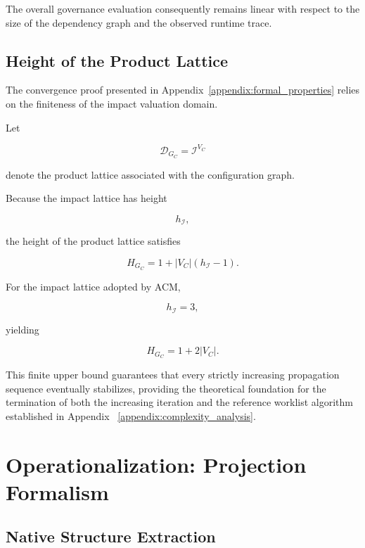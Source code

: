 \documentclass[10pt]{article}
\begin{document}
The overall governance evaluation consequently remains linear with respect to
the size of the dependency graph and the observed runtime trace.

\subsection{Height of the Product Lattice}
\label{appendix:lattice_height}

The convergence proof presented in Appendix~\ref{appendix:formal_properties}
relies on the finiteness of the impact valuation domain.

Let

\[
\mathcal D_{G_C}
=
\mathcal I^{V_C}
\]

denote the product lattice associated with the configuration graph.

Because the impact lattice has height

\[
h_{\mathcal I},
\]

the height of the product lattice satisfies

\begin{equation}
	\label{eq:product_lattice_height}
	H_{G_C}
	=
	1
	+
	|V_C|
	\left(
	h_{\mathcal I}-1
	\right).
\end{equation}

For the impact lattice adopted by ACM,

\[
h_{\mathcal I}=3,
\]

yielding

\begin{equation}
H_{G_C}
=
1+2|V_C|.
\label{eq:h_equality}
\end{equation}

This finite upper bound guarantees that every strictly increasing propagation sequence eventually stabilizes, providing the theoretical foundation for the termination of both the increasing iteration and the reference worklist algorithm established in Appendix ~\ref{appendix:complexity_analysis}.

\section{Operationalization: Projection Formalism}
\label{appendix:projection_formalism}
\subsection{Native Structure Extraction}
\end{document}
